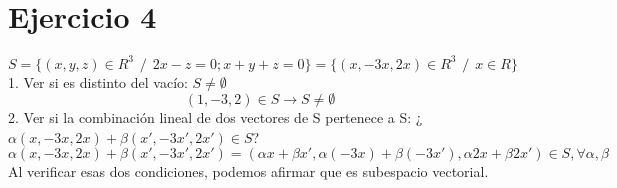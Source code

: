 \documentclass[fleqn]{article}
\begin{document}
	\section{Ejercicio 4}
	\[
	S = \{(x,y,z)\in R^3 \hspace{5pt}/\hspace{5pt}2x - z = 0; x + y + z = 0\} = \{(x,-3x,2x)\in R^3 \hspace{5pt}/\hspace{5pt}x \in R\}
	\]
	1. Ver si es distinto del vacío: $S \neq \emptyset$
	\[
	(1,-3,2) \in S \rightarrow S \neq \emptyset 
	\]
	2. Ver si la combinación lineal de dos vectores de S pertenece a S: ¿$\alpha(x,-3x,2x) + \beta(x',-3x',2x') \in S$?
	\[
	\alpha(x,-3x,2x) + \beta(x',-3x',2x') = (\alpha x + \beta x', \alpha (-3x)+\beta(-3x'),\alpha 2x + \beta 2x') \in S, \forall \alpha , \beta
	\]
	Al verificar esas dos condiciones, podemos afirmar que es subespacio vectorial.
\end{document}
